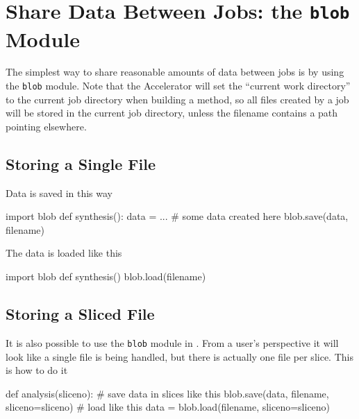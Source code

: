 
\section{Share Data Between Jobs:  the \texttt{blob} Module}

The simplest way to share reasonable amounts of data between jobs is
by using the \texttt{blob} module.  Note that the Accelerator will set
the ``current work directory'' to the current job directory when
building a method, so all files created by a job will be stored in the
current job directory, unless the filename contains a path pointing
elsewhere.

\subsection*{Storing a  Single File}
Data is saved in this way
\begin{python}
import blob
def synthesis():
    data = ...  # some data created here
    blob.save(data, filename)
\end{python}
The data is loaded like this
\begin{python}
import blob
def synthesis()
    blob.load(filename)
\end{python}



\subsection{Storing a Sliced File}
It is also possible to use the \texttt{blob} module in \analysis.
From a user's perspective it will look like a single file is being
handled, but there is actually one file per slice.  This is how to do
it
\begin{python}
def analysis(sliceno):
    # save data in slices like this
    blob.save(data, filename, sliceno=sliceno)
    # load like this
    data = blob.load(filename, sliceno=sliceno)
\end{python}



